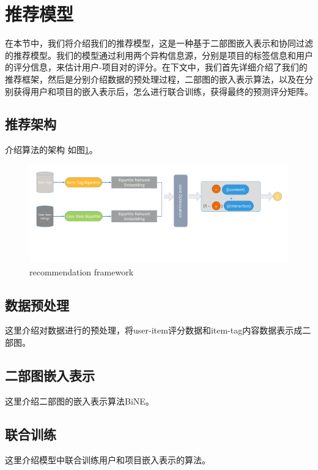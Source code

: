 \documentclass[lang=cn,11pt]{elegantpaper}
\begin{document}
\section{推荐模型}

在本节中，我们将介绍我们的推荐模型，这是一种基于二部图嵌入表示和协同过滤的推荐模型。我们的模型通过利用两个异构信息源，分别是项目的标签信息和用户的评分信息，来估计用户-项目对的评分。在下文中，我们首先详细介绍了我们的推荐框架，然后是分别介绍数据的预处理过程，二部图的嵌入表示算法，以及在分别获得用户和项目的嵌入表示后，怎么进行联合训练，获得最终的预测评分矩阵。

 
\subsection{推荐架构}

介绍算法的架构 如图\ref{fig:framwork}。

\begin{figure}[t]
	\centering
	\includegraphics[width=1.0\textwidth]{imgs/framework.png}
	\caption{recommendation framework \label{fig:framwork}}
\end{figure}

\subsection{数据预处理}

这里介绍对数据进行的预处理，将user-item评分数据和item-tag内容数据表示成二部图。

\subsection{二部图嵌入表示}

这里介绍二部图的嵌入表示算法BiNE。


\subsection{联合训练}

这里介绍模型中联合训练用户和项目嵌入表示的算法。
\end{document}
